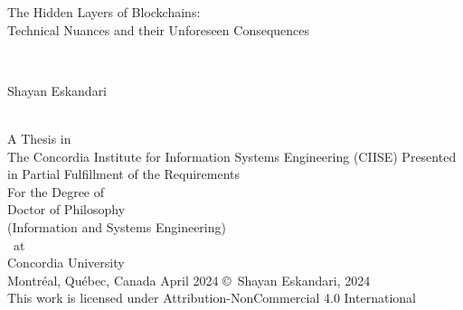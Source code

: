 
\thispagestyle{empty} %

\begin{center} 
\begin{Large} The Hidden Layers of Blockchains: \\ Technical Nuances and their Unforeseen Consequences\end{Large}\\[3em]
\begin{large} Shayan Eskandari \end{large}\\
\vfill
A Thesis in\\
The Concordia Institute for Information Systems Engineering (CIISE)
\vfill
Presented in Partial Fulfillment of the Requirements\\
For the Degree of\\
Doctor of Philosophy\\ 
(Information and Systems Engineering)\\~at\\
Concordia University\\
Montr\'{e}al, Qu\'{e}bec, Canada
\vfill
April 2024 %
\vfill
\copyright~Shayan Eskandari, 2024\\
This work is licensed under Attribution-NonCommercial 4.0 International
\end{center}

